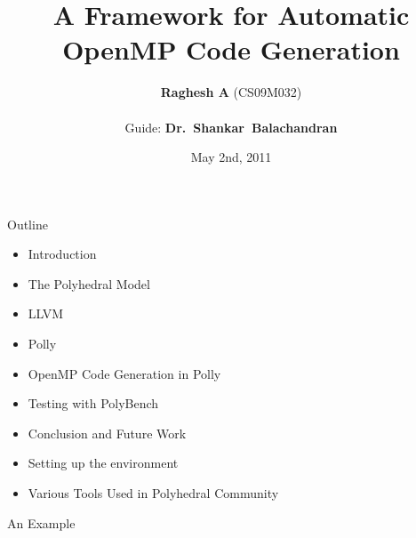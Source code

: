 \documentclass{beamer}
\title{A Framework for Automatic OpenMP Code Generation
 }
\author{\textbf{Raghesh A} (CS09M032)\\\ \\ Guide: \textbf{Dr.~Shankar~Balachandran}}
\date{May 2nd, 2011}
\begin{document}
\begin{frame}
\titlepage
\end{frame}

\begin{frame}{Outline}
\begin{itemize}
\item Introduction
\item The Polyhedral Model
\item LLVM
\item Polly
\item OpenMP Code Generation in Polly
\item Testing with PolyBench
\item Conclusion and Future Work
\item Setting up the environment
\item Various Tools Used in Polyhedral Community
\end{itemize}
\end{frame}


\begin{frame}{An Example}
\begin{columns}[t]
\end{columns}
\end{frame}
\end{document}
